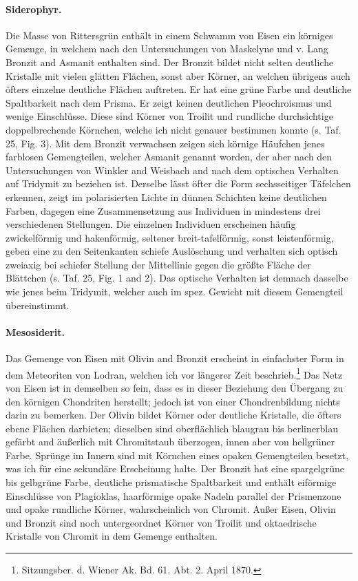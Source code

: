\documentclass[a4paper, 12pt, oneside]{article}
\begin{document}
\paragraph{Siderophyr.} Die Masse von Rittersgrün enthält in einem Schwamm von Eisen ein körniges Gemenge, in welchem nach den Untersuchungen von Maskelyne und v. Lang Bronzit and Asmanit enthalten sind. Der Bronzit bildet nicht selten deutliche Kristalle mit vielen glätten Flächen, sonst aber Körner, an welchen übrigens auch öfters einzelne deutliche Flächen auftreten. Er hat eine grüne Farbe und deutliche Spaltbarkeit nach dem Prisma. Er zeigt keinen deutlichen Pleochroismus und wenige Einschlüsse. Diese sind Körner von Troilit und rundliche durchsichtige doppelbrechende Körnchen, welche ich nicht genauer bestimmen konnte (s. Taf. 25, Fig. 3). Mit dem Bronzit verwachsen zeigen sich körnige Häufchen jenes farblosen Gemengteilen, welcher Asmanit genannt worden, der aber nach den Untersuchungen von Winkler and Weisbach and nach dem optischen Verhalten auf Tridymit zu beziehen ist. Derselbe lässt öfter die Form sechsseitiger Täfelchen erkennen, zeigt im polarisierten Lichte in dünnen Schichten keine deutlichen Farben, dagegen eine Zusammensetzung aus Individuen in mindestens drei verschiedenen Stellungen. Die einzelnen Individuen erscheinen häufig zwickelförmig und hakenförmig, seltener breit-tafelförmig, sonst leistenförmig, geben eine zu den Seitenkanten schiefe Auslöschung und verhalten sich optisch zweiaxig bei schiefer Stellung der Mittellinie gegen die größte Fläche der Blättchen (s. Taf. 25, Fig. 1 and 2). Das optische Verhalten ist demnach dasselbe wie jenes beim Tridymit, welcher auch im spez. Gewicht mit diesem Gemengteil übereinstimmt.

\paragraph{Mesosiderit.} Das Gemenge von Eisen mit Olivin and Bronzit erscheint in einfachster Form in dem Meteoriten von Lodran, welchen ich vor längerer Zeit beschrieb.\footnote{Sitzungsber. d. Wiener Ak. Bd. 61. Abt. 2. April 1870.} Das Netz von Eisen ist in demselben so fein, dass es in dieser Beziehung den Übergang zu den körnigen Chondriten herstellt; jedoch ist von einer Chondrenbildung nichts darin zu bemerken. Der Olivin bildet Körner oder deutliche Kristalle, die öfters ebene Flächen darbieten; dieselben sind oberflächlich blaugrau bis berlinerblau gefärbt and äußerlich mit Chromitstaub überzogen, innen aber von hellgrüner Farbe. Sprünge im Innern sind mit Körnchen eines opaken Gemengteilen besetzt, was ich für eine sekundäre Erscheinung halte. Der Bronzit hat eine spargelgrüne bis gelbgrüne Farbe, deutliche prismatische Spaltbarkeit und enthält eiförmige Einschlüsse von Plagioklas, haarförmige opake Nadeln parallel der Prismenzone und opake rundliche Körner, wahrscheinlich von Chromit. Außer Eisen, Olivin und Bronzit sind noch untergeordnet Körner von Troilit und oktaedrische Kristalle von Chromit in dem Gemenge enthalten.
\end{document}
